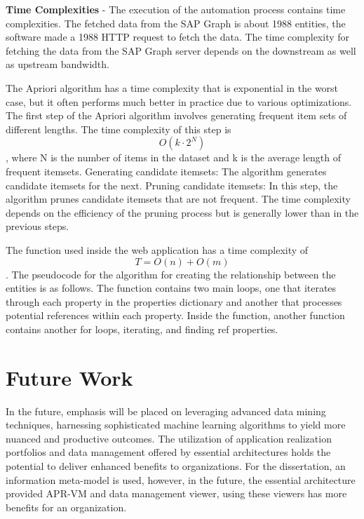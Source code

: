 \documentclass{article}
\begin{document}
\textbf{Time Complexities} - The execution of the automation process contains time complexities. The fetched data from the SAP Graph is about 1988 entities, the software made a 1988 HTTP request to fetch the data. The time complexity for fetching the data from the SAP Graph server depends on the downstream as well as upstream bandwidth. 

The Apriori algorithm has a time complexity that is exponential in the worst case, but it often performs much better in practice due to various optimizations. The first step of the Apriori algorithm involves generating frequent item sets of different lengths. The time complexity of this step is \begin{equation}O(k \cdot 2^{N})\end{equation}, where N is the number of items in the dataset and k is the average length of frequent itemsets. Generating candidate itemsets: The algorithm generates candidate itemsets for the next. Pruning candidate itemsets: In this step, the algorithm prunes candidate itemsets that are not frequent. The time complexity depends on the efficiency of the pruning process but is generally lower than in the previous steps. \parencite{xie2008}

The function used inside the web application has a time complexity of \begin{equation}
    T = O(n) + O(m)
\end{equation}. The pseudocode for the algorithm for creating the relationship between the entities is as follows. The function contains two main loops, one that iterates through each property in the properties dictionary and another that processes potential references within each property. Inside the function, another function contains another for loops, iterating, and finding ref properties. 

\clearpage
\maketitle
\section{Future Work}

In the future, emphasis will be placed on leveraging advanced data mining techniques, harnessing sophisticated machine learning algorithms to yield more nuanced and productive outcomes. The utilization of application realization portfolios and data management offered by essential architectures holds the potential to deliver enhanced benefits to organizations. For the dissertation, an information meta-model is used, however, in the future, the essential architecture provided APR-VM and data management viewer, using these viewers has more benefits for an organization.
\end{document}
